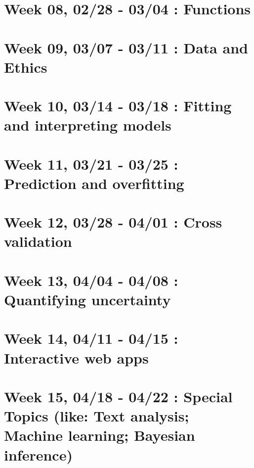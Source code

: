 \documentclass[
]{book}
\begin{document}
\hypertarget{week-08-0228---0304-functions}{%
\section{Week 08, 02/28 - 03/04 : Functions}\label{week-08-0228---0304-functions}}

\hypertarget{week-09-0307---0311-data-and-ethics}{%
\section{Week 09, 03/07 - 03/11 : Data and Ethics}\label{week-09-0307---0311-data-and-ethics}}

\hypertarget{week-10-0314---0318-fitting-and-interpreting-models}{%
\section{Week 10, 03/14 - 03/18 : Fitting and interpreting models}\label{week-10-0314---0318-fitting-and-interpreting-models}}

\hypertarget{week-11-0321---0325-prediction-and-overfitting}{%
\section{Week 11, 03/21 - 03/25 : Prediction and overfitting}\label{week-11-0321---0325-prediction-and-overfitting}}

\hypertarget{week-12-0328---0401-cross-validation}{%
\section{Week 12, 03/28 - 04/01 : Cross validation}\label{week-12-0328---0401-cross-validation}}

\hypertarget{week-13-0404---0408-quantifying-uncertainty}{%
\section{Week 13, 04/04 - 04/08 : Quantifying uncertainty}\label{week-13-0404---0408-quantifying-uncertainty}}

\hypertarget{week-14-0411---0415-interactive-web-apps}{%
\section{Week 14, 04/11 - 04/15 : Interactive web apps}\label{week-14-0411---0415-interactive-web-apps}}

\hypertarget{week-15-0418---0422-special-topics-like-text-analysis-machine-learning-bayesian-inference}{%
\section{Week 15, 04/18 - 04/22 : Special Topics (like: Text analysis; Machine learning; Bayesian inference)}\label{week-15-0418---0422-special-topics-like-text-analysis-machine-learning-bayesian-inference}}
\end{document}
